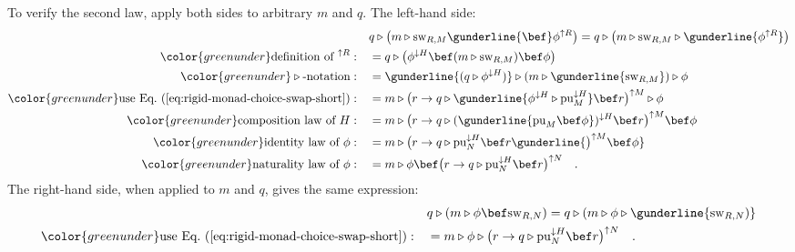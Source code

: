 To verify the second law, apply both sides to arbitrary $m$ and $q$.
The left-hand side:
\begin{align*}
 & q\triangleright\big(m\triangleright\text{sw}_{R,M}\gunderline{\bef}\phi^{\uparrow R}\big)=q\triangleright\big(m\triangleright\text{sw}_{R,M}\triangleright\gunderline{\phi^{\uparrow R}}\big)\\
{\color{greenunder}\text{definition of }^{\uparrow R}:}\quad & =q\triangleright\big(\phi^{\downarrow H}\bef(m\triangleright\text{sw}_{R,M})\bef\phi\big)\\
{\color{greenunder}\triangleright\text{-notation}:}\quad & =\gunderline{(q\triangleright\phi^{\downarrow H})}\triangleright(m\triangleright\gunderline{\text{sw}_{R,M}})\triangleright\phi\\
{\color{greenunder}\text{use Eq.~(\ref{eq:rigid-monad-choice-swap-short})}:}\quad & =m\triangleright\big(r\rightarrow q\triangleright\gunderline{\phi^{\downarrow H}\triangleright\text{pu}_{M}^{\downarrow H}}\bef r\big)^{\uparrow M}\triangleright\phi\\
{\color{greenunder}\text{composition law of }H:}\quad & =m\triangleright\big(r\rightarrow q\triangleright(\gunderline{\text{pu}_{M}\bef\phi})^{\downarrow H}\bef r\big)^{\uparrow M}\bef\phi\\
{\color{greenunder}\text{identity law of }\phi:}\quad & =m\triangleright\big(r\rightarrow q\triangleright\text{pu}_{N}^{\downarrow H}\bef r\gunderline{\big)^{\uparrow M}\bef\phi}\\
{\color{greenunder}\text{naturality law of }\phi:}\quad & =m\triangleright\phi\bef\big(r\rightarrow q\triangleright\text{pu}_{N}^{\downarrow H}\bef r\big)^{\uparrow N}\quad.
\end{align*}
The right-hand side, when applied to $m$ and $q$, gives the same
expression:
\begin{align*}
 & q\triangleright(m\triangleright\phi\bef\text{sw}_{R,N})=q\triangleright(m\triangleright\phi\triangleright\gunderline{\text{sw}_{R,N})}\\
{\color{greenunder}\text{use Eq.~(\ref{eq:rigid-monad-choice-swap-short})}:}\quad & =m\triangleright\phi\triangleright\big(r\rightarrow q\triangleright\text{pu}_{N}^{\downarrow H}\bef r\big)^{\uparrow N}\quad.
\end{align*}

